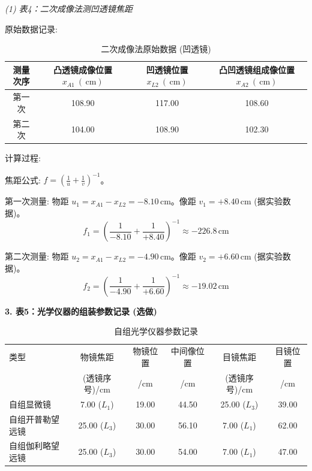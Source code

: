 ﻿\documentclass[12pt,a4paper]{article}
\newcommand{\rmcm}{\mathrm{\,cm}}
\begin{document}
\noindent\textit{(1) 表4：二次成像法测凹透镜焦距}
\par\noindent 原始数据记录:
\begin{table}[H]
    \centering
    \caption{二次成像法原始数据 (凹透镜)}
    \begin{tabular}{cccc}
        \toprule[1.5pt]
        测量次序 & 凸透镜成像位置 $x_{A1}~(\rmcm)$ & 凹透镜位置 $x_{L2}~(\rmcm)$ & 凸凹透镜组成像位置 $x_{A2}~(\rmcm)$ \\
        \midrule
        第一次 & 108.90 & 117.00 & 108.60 \\
        第二次 & 104.00 & 108.90 & 102.30 \\
        \bottomrule[1.5pt]
    \end{tabular}
    \label{tab:concave_direct_raw_refined}
\end{table}
\par\noindent 计算过程:
\par 焦距公式: $f = \left(\frac{1}{u} + \frac{1}{v}\right)^{-1}$。
\par 第一次测量: 物距 $u_1 = x_{A1} - x_{L2} = -8.10 \rmcm$。像距 $v_1 = +8.40 \rmcm$ (据实验数据)。
\begin{equation*}
f_1 = \left(\frac{1}{-8.10} + \frac{1}{+8.40}\right)^{-1} \approx -226.8 \rmcm
\end{equation*}
\par 第二次测量: 物距 $u_2 = x_{A1} - x_{L2} = -4.90 \rmcm$。像距 $v_2 = +6.60 \rmcm$ (据实验数据)。
\begin{equation*}
f_2 = \left(\frac{1}{-4.90} + \frac{1}{+6.60}\right)^{-1} \approx -19.02 \rmcm
\end{equation*}

\noindent\textbf{3. 表5：光学仪器的组装参数记录 (选做)}
\begin{table}[H]
    \centering
    \caption{自组光学仪器参数记录}
    \begin{tabular}{lccccc}
        \toprule[1.5pt]
        类型 & 物镜焦距 & 物镜位置 & 中间像位置 & 目镜焦距 & 目镜位置 \\
             & (透镜序号)/cm & /cm & /cm & (透镜序号)/cm & /cm \\
        \midrule
        自组显微镜 & 7.00 ($L_1$) & 19.00 & 44.50 & 25.00 ($L_3$) & 39.00 \\
        自组开普勒望远镜 & 25.00 ($L_3$) & 30.00 & 56.10 & 7.00 ($L_1$) & 62.00 \\
        自组伽利略望远镜 & 25.00 ($L_3$) & 30.00 & 54.00 & 7.00 ($L_1$) & 47.00 \\
        \bottomrule[1.5pt]
    \end{tabular}
    \label{tab:optical_instruments_assembly}
\end{table}
\end{document}
